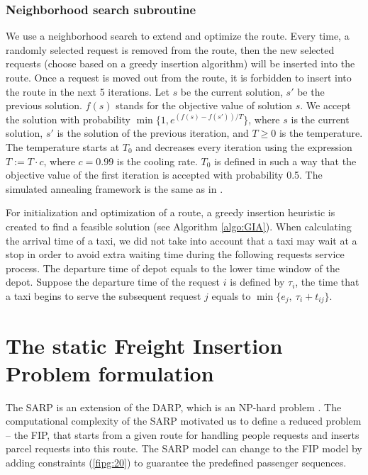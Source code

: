 \documentclass[preprint,authoryear,12pt]{elsarticle}
\begin{document}
\subsubsection{Neighborhood search subroutine}  
\label{algoNS}  
We use a neighborhood search to extend and optimize the route. Every time, a randomly selected request is removed from the route, then the new selected requests (choose based on a greedy insertion algorithm) will be inserted into the route. Once a request is moved out from the route, it is forbidden to insert into the route in the next 5 iterations. Let $s$ be the current solution, $s'$ be the previous solution.
$f(s)$ stands for the objective value of solution $s$. We accept the solution with probability $\min\{1,e^{(f(s)-f(s'))/T}\}$, where $s$ is the current solution, $s'$ is the solution of the previous iteration, and $T \geq 0$ is the temperature. The temperature starts at $T_0$ and decreases every iteration using the expression $T := T\cdot c$, where $c=0.99$ is the cooling rate. $T_0$ is defined in such a way that the objective value of the first iteration is accepted with probability 0.5.  The simulated annealing framework is the same as in \cite{Pisinger}.


For initialization and optimization of a route, a greedy insertion heuristic is created to find a feasible solution (see Algorithm \ref{algo:GIA}). When calculating the arrival time of a taxi, we did not take into account that a taxi may wait at a stop in order to avoid extra waiting time during the following requests service process. The departure time of depot equals to the lower time window of the depot. Suppose the departure time of the request $i$ is defined by $\tau_i$, the time that a taxi begins to serve the subsequent request $j$ equals to $\min\{e_j,~\tau_i+t_{ij}\}$. 





\section{The static Freight Insertion Problem formulation}
\label{fip_model}

The SARP is an extension of the DARP, which is an NP-hard problem \citep{Baugh}. The computational complexity of the SARP motivated us to define a reduced problem -- the FIP, that starts from a given route for handling people requests and inserts parcel requests into this route. The SARP model can change to the FIP model by adding constraints (\ref{fipg:20}) to guarantee the predefined passenger sequences.
\end{document}
